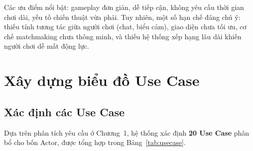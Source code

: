 \documentclass[13pt, a4paper]{extreport}
\begin{document}
Các ưu điểm nổi bật: gameplay đơn giản, dễ tiếp cận, không yêu cầu thời gian chơi dài, yếu tố
chiến thuật vừa phải. Tuy nhiên, một số hạn chế đáng chú ý: thiếu tính tương tác giữa người chơi
(chat, biểu cảm), giao diện chưa tối ưu, cơ chế matchmaking chưa thông minh, và thiếu hệ thống
xếp hạng lâu dài khiến người chơi dễ mất động lực.

\section{Xây dựng biểu đồ Use Case}

\subsection{Xác định các Use Case}

Dựa trên phân tích yêu cầu ở Chương~1, hệ thống xác định \textbf{20 Use Case} phân bổ cho bốn
Actor, được tổng hợp trong Bảng~\ref{tab:usecase}.
\end{document}
